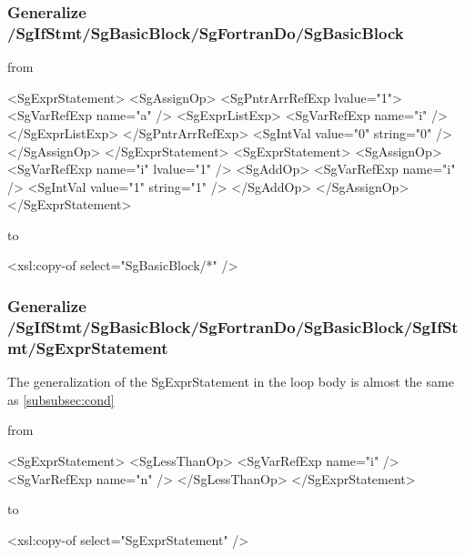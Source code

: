 \subsubsection{Generalize /SgIfStmt/SgBasicBlock/SgFortranDo/SgBasicBlock}


from

\begin{framed}
\begin{src}
				<SgExprStatement>
					<SgAssignOp>
						<SgPntrArrRefExp lvalue="1">
							<SgVarRefExp name="a" />
							<SgExprListExp>
								<SgVarRefExp name="i" />
							</SgExprListExp>
						</SgPntrArrRefExp>
						<SgIntVal value="0" string="0" />
					</SgAssignOp>
				</SgExprStatement>
				<SgExprStatement>
					<SgAssignOp>
						<SgVarRefExp name="i" lvalue="1" />
						<SgAddOp>
							<SgVarRefExp name="i" />
							<SgIntVal value="1" string="1" />
						</SgAddOp>
					</SgAssignOp>
				</SgExprStatement>
\end{src}
\end{framed}

to

\begin{framed}
\begin{src}
					<xsl:copy-of select="SgBasicBlock/*" />
\end{src}
\end{framed}

\subsubsection{Generalize /SgIfStmt/SgBasicBlock/SgFortranDo/SgBasicBlock/SgIfStmt/SgExprStatement}

The generalization of the SgExprStatement in the loop body is almost the same as \ref{subsubsec:cond}

from

\begin{framed}
\begin{src}
					<SgExprStatement>
						<SgLessThanOp>
							<SgVarRefExp name="i" />
							<SgVarRefExp name="n" />
						</SgLessThanOp>
					</SgExprStatement>
\end{src}
\end{framed}

to

\begin{framed}
\begin{src}
		<xsl:copy-of select="SgExprStatement" />
\end{src}
\end{framed}


